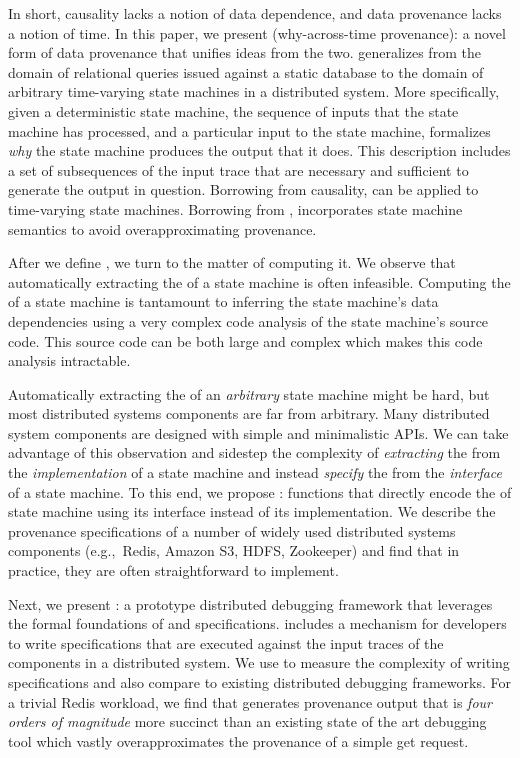 In short, causality lacks a notion of data dependence, and data provenance
lacks a notion of time. In this paper, we present 
(why-across-time provenance): a novel form of data provenance that unifies
ideas from the two. \Watprovenance{} generalizes \whyprovenance{} from the
domain of relational queries issued against a static database to the domain of
arbitrary time-varying state machines in a distributed system. More
specifically, given a deterministic state machine, the sequence of inputs that
the state machine has processed, and a particular input to the state machine,
\watprovenance{} formalizes \emph{why} the state machine produces the output
that it does. This description includes a set of subsequences of the input
trace that are necessary and sufficient to generate the output in
question. Borrowing from causality, \watprovenance{} can be applied to
time-varying state machines. Borrowing from \whyprovenance{}, \watprovenance{}
incorporates state machine semantics to avoid overapproximating provenance.

After we define \watprovenance{}, we turn to the matter of computing it. We
observe that automatically extracting the \watprovenance{} of a state machine
is often infeasible. Computing the \watprovenance{} of a state machine is
tantamount to inferring the state machine's data dependencies using a very
complex code analysis of the state machine's source code. This source code can
be both large and complex which makes this code analysis intractable.

Automatically extracting the \watprovenance{} of an \emph{arbitrary} state
machine might be hard, but most distributed systems components are far from
arbitrary. Many distributed system components are designed with simple and
minimalistic APIs. We can take advantage of this observation and sidestep the
complexity of \emph{extracting} the \watprovenance{} from the
\emph{implementation} of a state machine and instead \emph{specify} the
\watprovenance{} from the \emph{interface} of a state machine. To this end, we
propose : functions that directly
encode the \watprovenance{} of state machine using its interface instead of its
implementation. We describe the provenance specifications of a number of widely
used distributed systems components (e.g.,\ Redis, Amazon S3, HDFS, Zookeeper)
and find that in practice, they are often straightforward to implement.

Next, we present \fluent{}: a prototype distributed debugging framework that
leverages the formal foundations of \watprovenance{} and \watprovenance{}
specifications. \fluent{} includes a mechanism for developers to write
\watprovenance{} specifications that are executed against the input traces of
the components in a distributed system. We use \fluent{} to measure the
complexity of writing \watprovenance{} specifications and also compare
\fluent{} to existing distributed debugging frameworks. For a trivial Redis
workload, we find that \fluent{} generates provenance output that is \emph{four
orders of magnitude} more succinct than an existing state of the art debugging
tool which vastly overapproximates the provenance of a simple get request.


